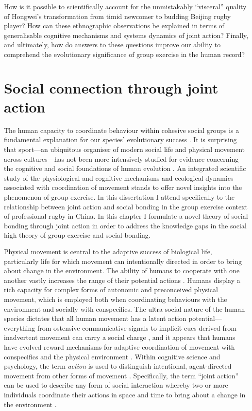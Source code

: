 \begin{CJK}{UTF8}{gbsn}
How is it possible to scientifically account for the unmistakably ``visceral'' quality of Hongwei's transformation from timid newcomer to budding Beijing rugby player?  How can these ethnographic observations be explained in terms of generalisable cognitive mechanisms and systems dynamics of joint action?  Finally, and ultimately, how do answers to these questions improve our ability to comprehend the evolutionary significance of group exercise in the human record?




\section{Social connection through joint action}
The human capacity to coordinate behaviour within cohesive social groups is a fundamental explanation for our species' evolutionary success \citep{Tomasello2009}.  It is surprising that sport---an ubiquitous organiser of modern social life and physical movement across cultures---has not been more intensively studied for evidence concerning the cognitive and social foundations of human evolution \citep{Blanchard1995,Downey2005a}.  An integrated scientific study of the physiological and cognitive mechanisms and ecological dynamics associated with coordination of movement stands to offer novel insights into the phenomenon of group exercise.  In this dissertation I attend specifically to the relationship between joint action and social bonding in the group exercise context of professional rugby in China.  In this chapter I formulate a novel theory of social bonding through joint action in order to address the knowledge gaps in the social high theory of group exercise and social bonding.

Physical movement is central to the adaptive success of biological life, particularly life for which movement can intentionally directed in order to bring about change in the environment.  The ability of humans to cooperate with one another vastly increases the range of their potential actions \citep{Tomasello2012}.  Humans display a rich capacity for complex forms of autonomic and preconceived physical movement, which is employed both when coordinating behaviours with the environment and socially with conspecifics.  The ultra-social nature of the human species dictates that all human movement has a latent action potential---everything from ostensive communicative signals to implicit cues derived from inadvertent movement can carry a social charge \citep{Danchin2004}, and it appears that humans have evolved reward mechanisms for adaptive coordination of movement with conspecifics and the physical environment \citep{Wheatley2012,Parkinson2015,Wheatley2016}.  Within cognitive science and psychology, the term \textit{action} is used to distinguish intentional, agent-directed movement from other forms of movement \citep{Davidson1980}.
Specifically, the term ``joint action'' can be used to describe any form of social interaction whereby two or more individuals coordinate their actions in space and time to bring about a change in the environment \citep{Sebanz2006}.


\end{CJK}

